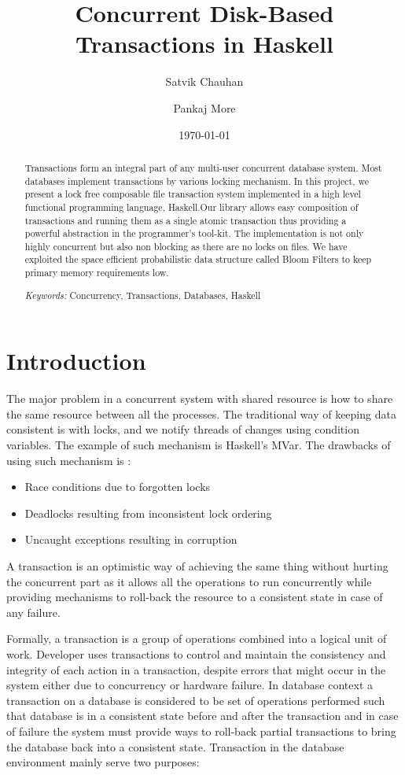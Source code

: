 \documentclass[11pt,a4paper]{article}
\title{ Concurrent Disk-Based Transactions in Haskell}
\author{Satvik Chauhan \and Pankaj More}
\date{{\small \today}}
\begin{document}
\maketitle
%
\begin{abstract}
Transactions form an integral part of any multi-user concurrent database system. Most databases implement transactions by various locking mechanism.
In this project, we present a lock free composable file transaction system implemented in a high level functional programming language, Haskell.Our library allows easy composition of transactions and running them as a single atomic transaction thus providing a powerful abstraction in the programmer's tool-kit. The implementation is not only highly concurrent but also non blocking as there are no locks on files. We have exploited the space efficient probabilistic data structure called Bloom Filters to keep primary memory requirements low.


\emph{Keywords:} Concurrency, Transactions, Databases, Haskell

\end{abstract}
%
\section{Introduction}

The major problem in a concurrent system with shared resource is how to share the same resource between all the processes. The traditional way of keeping data consistent is with locks, and we notify threads of changes using condition variables. The example of such mechanism is Haskell's MVar. The drawbacks of using such mechanism is :
\begin{itemize}
\item Race conditions due to forgotten locks
\item Deadlocks resulting from inconsistent lock ordering 
\item Uncaught exceptions resulting in corruption 
\end{itemize}

A transaction is an optimistic way of achieving the same thing without hurting the concurrent part as it allows  all the operations to run concurrently while providing mechanisms to roll-back the resource to a consistent state in case of any failure.

Formally, a transaction is a group of operations combined into a logical unit of work. Developer uses transactions to control and maintain the consistency and integrity of each action in a transaction, despite errors that might occur in the system either due to concurrency or hardware failure. In database context a transaction on a database is considered to be set of operations performed such that database is in a consistent state before and after the transaction and in case of failure the system must provide ways to roll-back partial transactions to bring the database back into a consistent state. Transaction in the database environment mainly serve two purposes:
\end{document}
